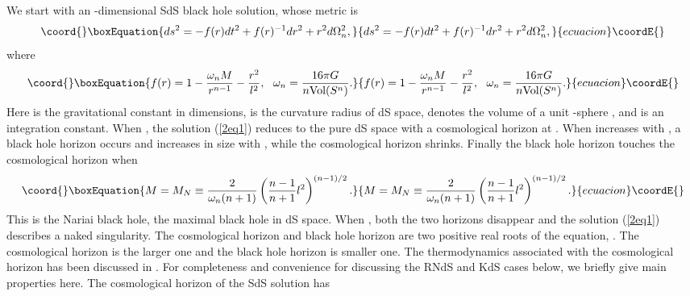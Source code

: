 \documentclass[a4paper,12pt]{article}
\begin{document}
We start with an \coordHE{}-dimensional SdS black hole solution, whose metric is
\begin{equation}\coord{}\boxEquation{
\label{2eq1}
ds^2 =-f(r)dt^2 +f(r)^{-1}dr^2 +r^2 d\Omega_n^2,
}{
ds^2 =-f(r)dt^2 +f(r)^{-1}dr^2 +r^2 d\Omega_n^2,
}{ecuacion}\coordE{}\end{equation}
where
\begin{equation}\coord{}\boxEquation{
f(r) = 1 -\frac{\omega_n M}{r^{n-1}} -\frac{r^2}{l^2}, 
\ \ \omega_n=\frac{16\pi G}{n\mbox {Vol}(S^n)}. 
}{
f(r) = 1 -\frac{\omega_n M}{r^{n-1}} -\frac{r^2}{l^2}, 
\ \ \omega_n=\frac{16\pi G}{n\mbox {Vol}(S^n)}. 
}{ecuacion}\coordE{}\end{equation}
Here \coordHE{} is the gravitational constant in \coordHE{} dimensions, \coordHE{} is the curvature radius
of dS space, \coordHE{} denotes the volume of a unit \coordHE{}-sphere \coordHE{}, and
\coordHE{} is an integration constant. When \coordHE{}, the solution (\ref{2eq1}) reduces to the pure
dS space with a cosmological horizon at \coordHE{}. When \coordHE{} increases with \coordHE{}, a black hole
horizon occurs and increases in size with \coordHE{}, while the cosmological horizon shrinks.
Finally the black hole horizon \coordHE{} touches the cosmological horizon \coordHE{} when
\begin{equation}\coord{}\boxEquation{
\label{2eq3}
M= M_N \equiv \frac{2}{\omega_n (n+1)}\left(\frac{n-1}{n+1}l^2\right)^{(n-1)/2}.
}{
M= M_N \equiv \frac{2}{\omega_n (n+1)}\left(\frac{n-1}{n+1}l^2\right)^{(n-1)/2}.
}{ecuacion}\coordE{}\end{equation}
This is the Nariai black hole, the maximal black hole in dS space. When \coordHE{}, both the
two horizons disappear and the solution (\ref{2eq1}) describes a naked singularity.  
The cosmological horizon \coordHE{} and black hole horizon \coordHE{} are two positive 
real roots of the 
equation, \coordHE{}. The cosmological horizon is the larger one  and the black hole horizon
is smaller one. The thermodynamics associated with the cosmological horizon has been discussed
in \cite{Cai1}. For completeness and convenience for discussing the RNdS and KdS cases below,
we briefly give main properties here. The cosmological horizon of the SdS solution has
\end{document}
